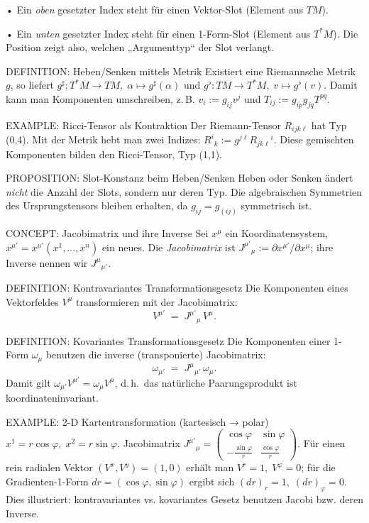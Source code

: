 \documentclass[10pt, letterpaper]{article}
\begin{document}
• Ein \emph{oben} gesetzter Index steht für einen Vektor-Slot
  (Element aus \(TM\)).  

• Ein \emph{unten} gesetzter Index steht für einen 1-Form-Slot
  (Element aus \(T^*M\)).  
Die Position zeigt also, welchen „Argumenttyp“ der Slot verlangt.

DEFINITION: Heben/Senken mittels Metrik  
Existiert eine Riemannsche Metrik \(g\), so liefert  
\(g^\sharp:T^*M\!\to\!TM,\;\alpha\mapsto g^{\sharp}(\alpha)\)
und \(g^\flat:TM\!\to\!T^*M,\;v\mapsto g^\flat(v)\).
Damit kann man Komponenten umschreiben, z.\,B.  
\(v_i := g_{ij}v^j\)  und  \(T_{ij} := g_{ip}g_{jq}T^{pq}\).

EXAMPLE: Ricci-Tensor als Kontraktion  
Der Riemann-Tensor \(R_{ijk\ell}\) hat Typ (0,4).  Mit der Metrik hebt
man zwei Indizes:  
\(R^i{}_{k} := g^{j\ell}R_{jk\ell}{}^{i}\).  Diese gemischten
Komponenten bilden den Ricci-Tensor, Typ (1,1).

PROPOSITION: Slot-Konstanz beim Heben/Senken  
Heben oder Senken ändert \emph{nicht} die Anzahl der Slots, sondern nur
deren Typ. Die algebraischen Symmetrien des Ursprungstensors bleiben
erhalten, da \(g_{ij}=g_{(ij)}\) symmetrisch ist.




CONCEPT: Jacobimatrix und ihre Inverse  
Sei \(x^\mu\) ein Koordinatensystem, \(x^{\mu'}=x^{\mu'}(x^1,\dots,x^n)\)
ein neues.  Die \emph{Jacobimatrix} ist  
\(J^{\mu'}{}_{\mu}:=\partial x^{\mu'}/\partial x^{\mu}\);  
ihre Inverse nennen wir \(J^{\mu}{}_{\mu'}\).

DEFINITION: Kontravariantes Transformationsgesetz  
Die Komponenten eines Vektorfeldes \(V^ \mu\) transformieren mit der
Jacobimatrix:
\[
V^{\mu'} \;=\; J^{\mu'}{}_{\mu}\,V^{\mu}.
\]

DEFINITION: Kovariantes Transformationsgesetz  
Die Komponenten einer 1-Form \(\omega_\mu\) benutzen die inverse
(transponierte) Jacobimatrix:
\[
\omega_{\mu'} \;=\; J^{\mu}{}_{\mu'}\,\omega_{\mu}.
\]
Damit gilt \(\omega_{\mu'}V^{\mu'}=\omega_{\mu}V^{\mu}\), d.\,h.\ das
natürliche Paarungsprodukt ist koordinateninvariant.

EXAMPLE: 2-D Kartentransformation (kartesisch → polar)  
\(x^1=r\cos\varphi,\; x^2=r\sin\varphi\).  
Jacobimatrix  
\(J^{\mu'}{}_{\mu}= \begin{pmatrix}\cos\varphi & \sin\varphi \\ -\tfrac{\sin\varphi}{r} & \tfrac{\cos\varphi}{r}\end{pmatrix}\).  
Für einen rein radialen Vektor \((V^x,V^y)=(1,0)\) erhält man  
\(V^{r}=1,\; V^{\varphi}=0\);  
für die Gradienten-1-Form \(d r = (\cos\varphi,\sin\varphi)\) ergibt
sich \((d r)_{r}=1,\;(d r)_{\varphi}=0\).
Dies illustriert: kontravariantes vs. kovariantes Gesetz benutzen
Jacobi bzw. deren Inverse.
\end{document}
